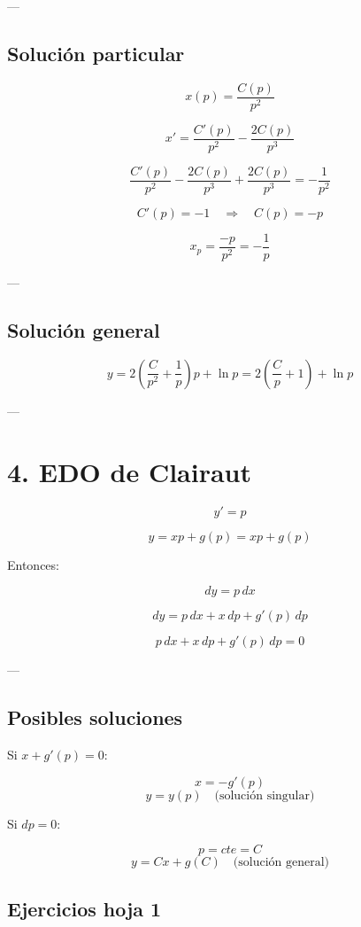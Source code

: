 \documentclass[a4paper,12pt]{article}
\begin{document}
---

\subsection*{Solución particular}

\[
x(p) = \frac{C(p)}{p^2}
\]

\[
x' = \frac{C'(p)}{p^2} - \frac{2C(p)}{p^3}
\]

\[
\frac{C'(p)}{p^2} - \frac{2C(p)}{p^3} + \frac{2C(p)}{p^3} = -\frac{1}{p^2}
\]

\[
C'(p) = -1 \quad \Rightarrow \quad C(p) = -p
\]

\[
x_p = \frac{-p}{p^2} = -\frac{1}{p}
\]

---

\subsection*{Solución general}

\[
y = 2 \left( \frac{C}{p^2} + \frac{1}{p} \right) p + \ln p = 2 \left( \frac{C}{p} + 1 \right) + \ln p
\]

---

\section*{4. EDO de Clairaut}

\[
y' = p
\]

\[
y = xp + g(p) = xp + g(p)
\]

Entonces:

\[
dy = p\, dx
\]

\[
dy = p\, dx + x\, dp + g'(p)\, dp
\]

\[
p\, dx + x\, dp + g'(p)\, dp = 0
\]

---

\subsection*{Posibles soluciones}

\quad Si \( x + g'(p) = 0 \):

\[
x = -g'(p)
\]
\[
y = y(p) \quad \text{(solución singular)}
\]

\quad Si \( dp = 0 \):

\[
p = cte = C
\]
\[
y = Cx + g(C) \quad \text{(solución general)}
\]
\subsection*{Ejercicios hoja 1}
\end{document}
